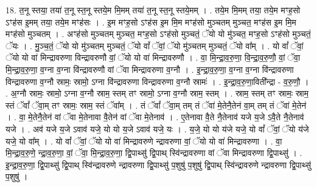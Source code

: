 \documentclass[17pt]{extarticle}
\begin{document}
18. त॒नू स्तया॒ तया॑ त॒नू स्त॒नू स्तये॒म मि॒मम् तया॑ त॒नू स्त॒नू स्तये॒मम् । . तये॒म मि॒मम् तया॒ तये॒म मꣳह॒सो ऽꣳह॑स इ॒मम् तया॒ तये॒म मꣳह॑सः । . इ॒म मꣳह॒सो ऽꣳह॑स इ॒म मि॒म मꣳह॑सो मुञ्चतम् मुञ्चत॒ मꣳह॑स इ॒म मि॒म मꣳह॑सो मुञ्चतम् । . अꣳह॑सो मुञ्चतम् मुञ्चत॒ मꣳह॒सो ऽꣳह॑सो मुञ्चतं॒ ॅयो यो मु॑ञ्चत॒ मꣳह॒सो ऽꣳह॑सो मुञ्चतं॒ ॅयः । . मु॒ञ्च॒तं॒ ॅयो यो मु॑ञ्चतम् मुञ्चतं॒ ॅयो वां᳚ ॅवां॒ ॅयो मु॑ञ्चतम् मुञ्चतं॒ ॅयो वा᳚म् । . यो वां᳚ ॅवां॒ ॅयो यो वा॑ मिन्द्रावरुणा विन्द्रावरुणौ वां॒ ॅयो यो वा॑ मिन्द्रावरुणौ । . वा॒ मि॒न्द्रा॒व॒रु॒णा॒ वि॒न्द्रा॒व॒रु॒णौ॒ वां॒ ॅवा॒ मि॒न्द्रा॒व॒रु॒णा॒ व॒ग्ना व॒ग्ना वि॑न्द्रावरुणौ वां ॅवा मिन्द्रावरुणा व॒ग्नौ । . इ॒न्द्रा॒व॒रु॒णा॒ व॒ग्ना व॒ग्ना वि॑न्द्रावरुणा विन्द्रावरुणा व॒ग्नौ स्रामः॒ स्रामो॒ ऽग्ना वि॑न्द्रावरुणा विन्द्रावरुणा व॒ग्नौ स्रामः॑ । . इ॒न्द्रा॒व॒रु॒णा॒विती᳚न्द्रा - व॒रु॒णौ॒ । . अ॒ग्नौ स्रामः॒ स्रामो॒ ऽग्ना व॒ग्नौ स्राम॒ स्तम् तꣳ स्रामो॒ ऽग्ना व॒ग्नौ स्राम॒ स्तम् । . स्राम॒ स्तम् तꣳ स्रामः॒ स्राम॒ स्तं ॅवां᳚ ॅवा॒म् तꣳ स्रामः॒ स्राम॒ स्तं ॅवा᳚म् । . तं ॅवां᳚ ॅवा॒म् तम् तं ॅवा॑ मे॒तेनै॒तेन॑ वा॒म् तम् तं ॅवा॑ मे॒तेन॑ । . वा॒ मे॒तेनै॒तेन॑ वां ॅवा मे॒तेनावा वै॒तेन॑ वां ॅवा मे॒तेनाव॑ । . ए॒तेनावा वै॒ते नै॒तेनाव॑ यजे य॒जे ऽवै॒ते नै॒तेनाव॑ यजे । . अव॑ यजे य॒जे ऽवाव॑ यजे॒ यो यो य॒जे ऽवाव॑ यजे॒ यः । . य॒जे॒ यो यो य॑जे यजे॒ यो वां᳚ ॅवां॒ ॅयो य॑जे यजे॒ यो वा᳚म् । . यो वां᳚ ॅवां॒ ॅयो यो वा॑ मिन्द्रावरुणे न्द्रावरुणा वां॒ ॅयो यो वा॑ मिन्द्रावरुणा । . वा॒ मि॒न्द्रा॒व॒रु॒णे॒ न्द्रा॒व॒रु॒णा॒ वां॒ ॅवा॒ मि॒न्द्रा॒व॒रु॒णा॒ द्वि॒पाथ्सु॑ द्वि॒पाथ् स्वि॑न्द्रावरुणा वां ॅवा मिन्द्रावरुणा द्वि॒पाथ्सु॑ । . इ॒न्द्रा॒व॒रु॒णा॒ द्वि॒पाथ्सु॑ द्वि॒पाथ् स्वि॑न्द्रावरुणे न्द्रावरुणा द्वि॒पाथ्सु॑ प॒शुषु॑ प॒शुषु॑ द्वि॒पाथ् स्वि॑न्द्रावरुणे न्द्रावरुणा द्वि॒पाथ्सु॑ प॒शुषु॑ । \newline
\end{document}
